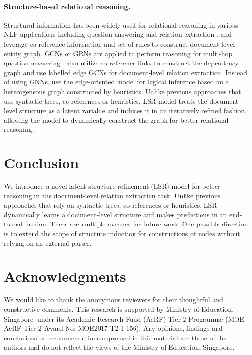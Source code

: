 \documentclass[11pt,a4paper]{article}
\begin{document}
\paragraph{Structure-based relational reasoning.}
Structural information has been widely used for relational reasoning in various NLP applications including question answering \citep{dhingra-etal-2018-neural, de2018question, song2018exploring} and relation extraction \citep{Sahu2019IntersentenceRE, christopoulou2019connecting}. \citet{song2018exploring} and \cite{de2018question} leverage co-reference information and set of rules to construct document-level entity graph. GCNs \citep{Kipf2016SemiSupervisedCW} or GRNs \citep{Song2018AGM} are applied to perform reasoning for multi-hop question answering \citep{welbl2018constructing}. \citet{Sahu2019IntersentenceRE} also utilize co-reference links to construct the dependency graph and use labelled edge GCNs \citep{Marcheggiani2017EncodingSW} for document-level relation extraction. Instead of using GNNs, \citet{christopoulou2019connecting} use the edge-oriented model \citep{christopoulou2018walk} for logical inference based on a heterogeneous graph constructed by heuristics. Unlike previous approaches  that use syntactic trees, co-references or heuristics, LSR model treats the document-level structure as a latent variable and induces it in an iteratively refined fashion, allowing the model to dynamically construct the graph for better relational reasoning. 






 \vspace{-1mm}
\section{Conclusion}
\vspace{-1mm}
We introduce a novel latent structure refinement (LSR) model for better reasoning in the document-level relation extraction task. Unlike previous approaches that rely on syntactic trees, co-references or  heuristics, LSR dynamically learns a document-level structure and makes predictions in an end-to-end fashion. There are multiple avenues for future work. One possible direction is to extend the scope of structure induction for constructions of nodes without relying on an external parser. 
%
 \vspace{-1mm}
\section*{Acknowledgments}
\vspace{-1mm}
We would like to thank the anonymous reviewers for their thoughtful and constructive comments. This research is supported by Ministry of Education, Singapore, under its Academic Research Fund (AcRF) Tier 2 Programme (MOE AcRF Tier 2 Award No: MOE2017-T2-1-156). Any opinions, findings and conclusions or recommendations expressed in this material are those of the authors and do not reflect the views of the Ministry of Education, Singapore.
%
 

\end{document}
